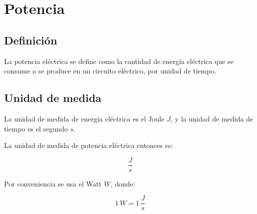 \documentclass[../principal.tex]{subfiles}
\begin{document}

\chapter{Potencia}

\section{Definición}

La potencia eléctrica se define como la cantidad de energía eléctrica que se consume o se produce en un circuito eléctrico, por unidad de tiempo.

\section{Unidad de medida}

La unidad de medida de energía eléctrica es el Joule $J$, y la unidad de medida de tiempo es el segundo $s$.

La unidad de medida de potencia eléctrica entonces es:

$$\frac{J}{s}$$

Por conveniencia se usa el Watt $W$, donde:

$$1 \, W = 1 \, \frac{J}{s}$$
\end{document}
